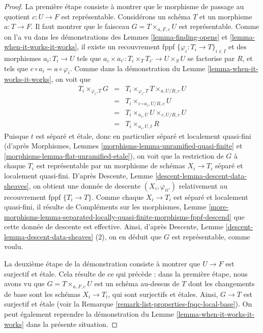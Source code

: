 \begin{proof}
\medskip\noindent
La première étape consiste à montrer que le morphisme de passage au quotient
$c : U \to F$ est représentable.
Considérons un schéma $T$ et un morphisme $a : T \to F$.
Il faut montrer que le faisceau $G = T \times_{a, F, c} U$
est représentable.
Comme on l'a vu dans les démonstrations des Lemmes \ref{lemma-finding-opens} et
\ref{lemma-when-it-works-it-works}, il existe un recouvrement fppf
$\{\varphi_i : T_i \to T\}_{i \in I}$ et des morphismes $a_i : T_i \to U$
tels que $a_i \times a_{i'} : T_i \times_T T_{i'} \to U \times_S U$
se factorise par $R$, et tels que $c \circ a_i = a \circ \varphi_i$.
Comme dans la démonstration du Lemme \ref{lemma-when-it-works-it-works}, on voit que
\begin{eqnarray*}
T_i \times_{\varphi_i, T} G & = &
T_i \times_{\varphi_i, T} T \times_{a, U/R, c} U \\
& = & T_i \times_{c \circ a_i, U/R, c} U \\
& = & T_i \times_{a_i, U} U \times_{c, U/R, c} U \\
& = & T_i \times_{a_i, U, t} R
\end{eqnarray*}
Puisque $t$ est séparé et \'etale, donc en particulier
séparé et localement quasi-fini (d'après Morphismes, Lemmes
\ref{morphisms-lemma-unramified-quasi-finite} et
\ref{morphisms-lemma-flat-unramified-etale}),
on voit que la restriction
de $G$ à chaque $T_i$ est représentable par un morphisme de schémas
$X_i \to T_i$ séparé et localement quasi-fini. D'après
Descente, Lemme \ref{descent-lemma-descent-data-sheaves},
on obtient une donnée de descente $(X_i, \varphi_{ii'})$ relativement
au recouvrement fppf $\{T_i \to T\}$. Comme chaque
$X_i \to T_i$ est séparé et localement quasi-fini, il résulte de
Compléments sur les morphismes, Lemme
\ref{more-morphisms-lemma-separated-locally-quasi-finite-morphisms-fppf-descend}
que cette donnée de descente est effective.
Ainsi, d'après
Descente, Lemme \ref{descent-lemma-descent-data-sheaves} (2),
on en déduit que $G$ est représentable, comme voulu.

\medskip\noindent
La deuxième étape de la démonstration consiste à montrer que $U \to F$ est surjectif et
\'etale. Cela résulte de ce qui précède : dans la première étape, nous avons
vu que $G = T \times_{a, F, c} U$ est un schéma au-dessus de $T$ dont les changements de base
sont les schémas $X_i \to T_i$, qui sont surjectifs et \'etales. Ainsi, $G \to T$
est surjectif et \'etale (voir la
Remarque \ref{remark-list-properties-fpqc-local-base}).
On peut également reprendre la démonstration du
Lemme \ref{lemma-when-it-works-it-works} dans la présente
situation.


\end{proof}
